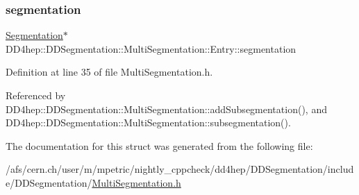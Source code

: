 \subsubsection{\texorpdfstring{segmentation}{segmentation}}
{\footnotesize\ttfamily \hyperlink{class_d_d4hep_1_1_d_d_segmentation_1_1_segmentation}{Segmentation}$\ast$ D\+D4hep\+::\+D\+D\+Segmentation\+::\+Multi\+Segmentation\+::\+Entry\+::segmentation}



Definition at line 35 of file Multi\+Segmentation.\+h.



Referenced by D\+D4hep\+::\+D\+D\+Segmentation\+::\+Multi\+Segmentation\+::add\+Subsegmentation(), and D\+D4hep\+::\+D\+D\+Segmentation\+::\+Multi\+Segmentation\+::subsegmentation().



The documentation for this struct was generated from the following file\+:\begin{DoxyCompactItemize}
\item 
/afs/cern.\+ch/user/m/mpetric/nightly\+\_\+cppcheck/dd4hep/\+D\+D\+Segmentation/include/\+D\+D\+Segmentation/\hyperlink{_d_d_segmentation_2include_2_d_d_segmentation_2_multi_segmentation_8h}{Multi\+Segmentation.\+h}\end{DoxyCompactItemize}
